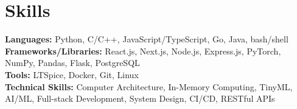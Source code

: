\documentclass[a4paper,10pt]{article}
\begin{document}
\section{Skills}
\vspace{-2pt}
\begin{itemize}[leftmargin=0.15in, label={}]
  \small{
  \item
  \textbf{Languages: }{Python, C/C++, JavaScript/TypeScript, Go, Java, bash/shell}\\
  \textbf{Frameworks/Libraries: }{React.js, Next.js, Node.js, Express.js, PyTorch, NumPy, Pandas, Flask, PostgreSQL}\\
  \textbf{Tools: }{LTSpice, Docker, Git, Linux}\\
  \textbf{Technical Skills: }{Computer Architecture, In-Memory Computing, TinyML, AI/ML, Full-stack Development, System Design, CI/CD, RESTful APIs}
  }
\end{itemize}
\end{document}
